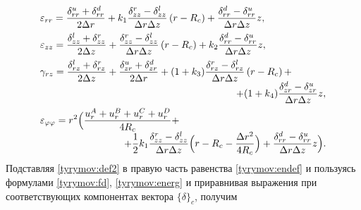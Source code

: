 \begin{equation}\label{tyrymov:def2}
    \begin{array}{l}
       \displaystyle \varepsilon_{rr}=\frac{\delta_{rr}^u+\delta_{rr}^d}{2\Delta r}+
      k_1\frac{\delta_{zz}^r-\delta_{zz}^l}{\Delta r\Delta z} \left(r-R_c\right)+
      \frac{\delta_{rr}^d-\delta_{rr}^u}{\Delta r\Delta z}z, \\[3mm]
        \displaystyle\varepsilon_{zz}=\frac{\delta_{zz}^l+\delta_{zz}^r}{2\Delta z}+
     \frac{\delta_{zz}^r-\delta_{zz}^l}{\Delta r\Delta z} \left(r-R_c\right)+
      k_2\frac{\delta_{rr}^d-\delta_{rr}^u}{\Delta r\Delta z}z ,\\[3mm]
       \displaystyle \gamma_{rz}=\frac{\delta_{rz}^l+\delta_{rz}^r}{2\Delta z}+
     \frac{\delta_{zr}^u+\delta_{zr}^d}{2\Delta r}+
       (1+k_3)\frac{\delta_{rz}^r-\delta_{rz}^l}{\Delta r\Delta z}\left(r-R_c\right)+ \\ 
\hspace{7cm}            \displaystyle +
       (1+k_4)\frac{\delta_{zr}^d-\delta_{zr}^u}{\Delta r\Delta z}z,\\[3mm]
      \displaystyle \varepsilon_{\varphi\varphi}=  
      r^2\Bigl(\frac{u_r^A+u_r^B+u_r^C+u_r^D}{4R_c}+ \\
\hspace{3cm}            \displaystyle       +
     \frac{1}{2}k_1\frac{\delta_{zz}^r-\delta_{zz}^l}{\Delta r\Delta z}
     \Bigl(r-R_c-\frac{\Delta r^2}{4R_c}\Bigr)+\frac{\delta_{rr}^d-\delta_{rr}^u}{\Delta r\Delta z}z\Bigr).
    \end{array} 
\end{equation}
Подставляя \eqref{tyrymov:def2} в правую часть равенства \eqref{tyrymov:endef} и
пользуясь формулами \eqref{tyrymov:fd}, \eqref{tyrymov:energ} и приравнивая выражения при соответствующих компонентах вектора $\{\delta\}_c$,  получим
